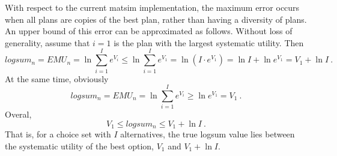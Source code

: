 With respect to the current \gls{matsim} implementation, the maximum error occurs when all plans are copies of the best plan, rather than having a diversity of plans.
%
An upper bound of this error 
can be approximated as follows.  Without loss of 
generality, assume that $i=1$ is the plan with the largest systematic utility.  Then
\[
logsum_n = EMU_n = \ln \sum_{i=1}^{I} e^{V_{i}}
%
\le \ln \sum_{i=1}^{I} e^{V_{1}}
%
= \ln ( I \cdot e^{V_{1}} )
%
= \ln I + \ln e^{V_{1}}
%
= V_{1} + \ln I \ .
\]
At the same time, obviously
\[
logsum_n = EMU_n = \ln \sum_{i=1}^{I} e^{V_i} \ge \ln e^{V_1} = V_1 \ .
\]
Overal,
\[
V_1 \le logsum_n \le V_1 + \ln I \ .
\]
That is, for a choice set with $I$ alternatives, the true logsum value lies between the systematic utility of the best option, $V_1$ and $V_1 + \ln I$.


 





